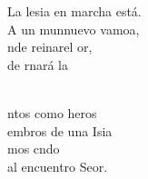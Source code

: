 \begin{cancion}
	La lesia en marcha está.\\
	A un munnuevo vamoa,\\
	nde reinarel or,\\
	de rnará la\\\jump\\
	\begin{chorus}%
	ntos como heros\\
	embros de una Isia\\
	mos cndo\\
	al encuentro  Seor.\\
	\end{chorus}%
	\jump\\
\end{cancion}%
